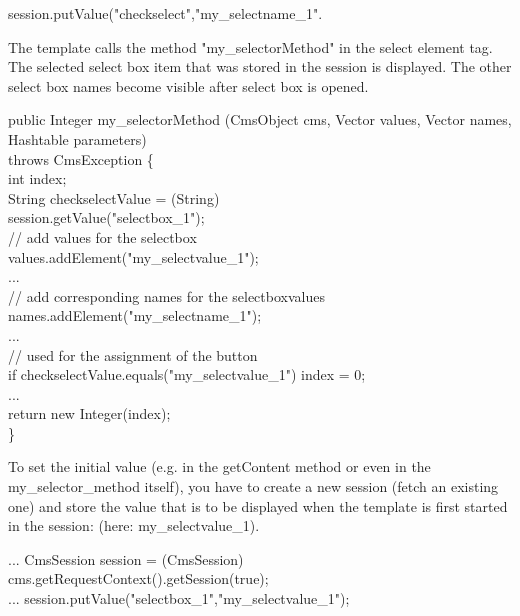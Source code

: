 {\code session.putValue("checkselect","my\_selectname\_1".}

The template calls the method {\meth "my\_selectorMethod"} in the select element
tag. The selected select box item that was stored in the session is
displayed. The other select box names become visible after select box
is opened.

\begin{java}
public Integer my\_selectorMethod (CmsObject cms, Vector values, Vector names, Hashtable parameters)\\
\jtabb                throws CmsException \{\\
\jtabb                int index;\\
\jtaba          String checkselectValue = (String)\\
\jtaba        session.getValue("selectbox\_1");\\
\jtaba        // add values for the selectbox\\
\jtaba        values.addElement("my\_selectvalue\_1");\\
\jtaba        ...\\
\jtaba        // add corresponding names for the selectboxvalues\\
\jtaba        names.addElement("my\_selectname\_1");\\
\jtaba        ...\\
\jtaba        // used for the assignment of the button\\
\jtaba        if checkselectValue.equals("my\_selectvalue\_1") index = 0;\\
\jtaba        ...\\
\jtaba        return new Integer(index);\\
\}\\
\end{java}

To set the initial value (e.g. in the {\meth getContent} method or even in the
{\meth my\_selector\_method} itself), you have to create a new session (fetch an
existing one) and store the value that is to be displayed when the
template is first started in the session: (here: {\meth my\_selectvalue\_1)}.

\begin{java}
...     CmsSession session = (CmsSession)\\
cms.getRequestContext().getSession(true);\\
...     session.putValue("selectbox\_1","my\_selectvalue\_1");\\
\end{java}
